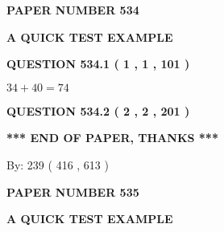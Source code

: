 \documentclass[12pt]{article}
\begin{document}
   
 {\textbf{ \Large{ PAPER NUMBER  534  }}}
   
   
\vspace{0.2in}
   
   
   
   
   
   
 \vspace{0.2in}
{\LARGE {\textbf{ A QUICK TEST EXAMPLE}}}
   
   
  
\vspace{0.2in}
  
{\textbf{\Large{QUESTION
534.1 
 ( 1 , 1 , 101 )
}}}
  
  
 
 

$ %
34 +  %
40=   %
74$
 
 
  
\vspace{0.2in}
  
{\textbf{\Large{QUESTION
534.2 
 ( 2 , 2 , 201 )
}}}
  
  
   
   
 \vspace{0.2in}
 
   
   
   
   
\vspace{1.0in} 
{\textbf{\large{ *** END OF PAPER, THANKS *** }}} 
   
   
\hspace{1.0in} By: 
 239 ( 416 ,  613 )
   
   
   
   
\newpage 
\setcounter{page}{ 
   535001 } 
   
   
   
   
 {\textbf{ \Large{ PAPER NUMBER  535  }}}
   
   
\vspace{0.2in}
   
   
   
   
   
   
 \vspace{0.2in}
{\LARGE {\textbf{ A QUICK TEST EXAMPLE}}}
   
   
  
\vspace{0.2in}
  
\end{document}
